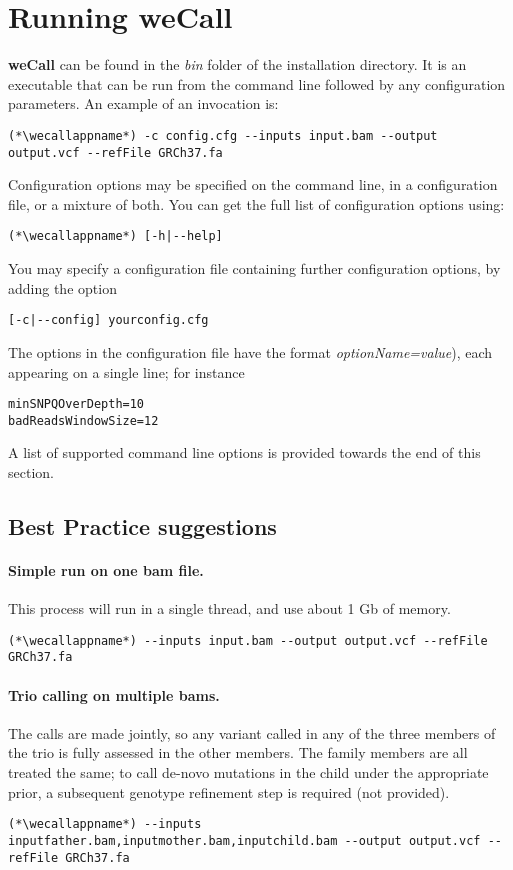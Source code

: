 \documentclass{article}
\newcommand{\wecallproduct}{\textbf{weCall}}
\newcommand{\wecallappname}{weCall}
\begin{document}
\section{Running {\wecallproduct}}
\textbf{{\wecallproduct}} can be found in the {\it bin} folder of the installation directory. It is an executable that can be run from the command line followed by any configuration parameters.  An example of an invocation is:
\begin{lstlisting}
(*\wecallappname*) -c config.cfg --inputs input.bam --output output.vcf --refFile GRCh37.fa
\end{lstlisting}
Configuration options may be specified on the command line, in a configuration file, or a mixture of both. You can get the full list of configuration options using:
\begin{lstlisting}
(*\wecallappname*) [-h|--help]
\end{lstlisting}
You may specify a configuration file containing further configuration options, by adding the option
\begin{lstlisting}
[-c|--config] yourconfig.cfg
\end{lstlisting}
The options in the configuration file have the format {\it optionName=value}), each appearing on a single line; for instance
\begin{lstlisting}
minSNPQOverDepth=10
badReadsWindowSize=12
\end{lstlisting}
A list of supported command line options is provided towards the end of this section.

\subsection{Best Practice suggestions}
\paragraph{Simple run on one bam file.}  This process will run in a single thread, and use about 1 Gb of memory.
\begin{lstlisting}
(*\wecallappname*) --inputs input.bam --output output.vcf --refFile GRCh37.fa
\end{lstlisting}
\paragraph{Trio calling on multiple bams.}  The calls are made jointly, so any variant called in any of the three members of the
trio is fully assessed in the other members.  The family members are all treated the same; to call de-novo mutations
in the child under the appropriate prior, a subsequent genotype refinement step is required (not provided).
\begin{lstlisting}
(*\wecallappname*) --inputs inputfather.bam,inputmother.bam,inputchild.bam --output output.vcf --refFile GRCh37.fa
\end{lstlisting}
\end{document}
